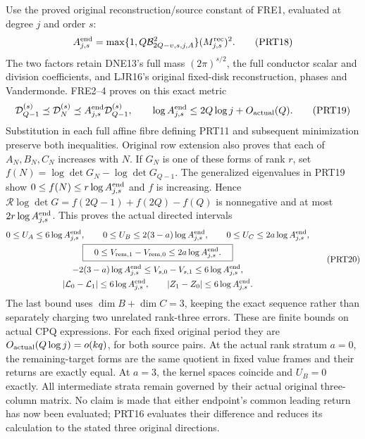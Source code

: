 \documentclass[11pt,a4paper]{article}
\begin{document}
Use the proved original reconstruction/source constant of FRE1,
evaluated at degree $j$ and order $s$:
\[
 A_{j,s}^{\rm end}=
 \max\{1,Q\mathcal B_{2Q-v,s,j,A}^{2}\}
                    (M_{j,s}^{\rm rec})^2.
 \tag{PRT18}
\]
The two factors retain DNE13's full mass $(2\pi)^{s/2}$,
the full conductor scalar and division coefficients, and LJR16's
original fixed-disk reconstruction, phases and Vandermonde.
FRE2--4 proves on this exact metric
\[
 \mathcal D_{Q-1}^{(s)}\preceq\mathcal D_N^{(s)}
   \preceq A_{j,s}^{\rm end}\mathcal D_{Q-1}^{(s)},
 \qquad
 \log A_{j,s}^{\rm end}\le2Q\log j+O_{\rm actual}(Q).
 \tag{PRT19}
\]
Substitution in each full affine fibre defining PRT11 and subsequent
minimization preserve both inequalities. Original row extension also
proves that each of $A_N,B_N,C_N$ increases with $N$.
If $G_N$ is one of these forms of rank $r$, set
$f(N)=\log\det G_N-\log\det G_{Q-1}$.
The generalized eigenvalues in PRT19 show $0\le f(N)\le
r\log A_{j,s}^{\rm end}$ and $f$ is increasing. Hence
$\mathcal R\log\det G=f(2Q-1)+f(2Q)-f(Q)$ is nonnegative
and at most $2r\log A_{j,s}^{\rm end}$.
This proves the actual directed intervals
\[
 \begin{gathered}
 0\le U_A\le6\log A_{j,s}^{\rm end},\qquad
 0\le U_B\le2(3-a)\log A_{j,s}^{\rm end},\qquad
 0\le U_C\le2a\log A_{j,s}^{\rm end},\\
 \boxed{\quad0\le V_{{\rm rem},1}-V_{{\rm rem},0}
                   \le2a\log A_{j,s}^{\rm end}.\quad}\\
 -2(3-a)\log A_{j,s}^{\rm end}
 \le V_{s,0}-V_{s,1}\le6\log A_{j,s}^{\rm end},\\
 |\mathcal L_0-\mathcal L_1|\le6\log A_{j,s}^{\rm end},
 \qquad |Z_1-Z_0|\le6\log A_{j,s}^{\rm end}.
 \end{gathered}\tag{PRT20}
\]
The last bound uses $\dim B+\dim C=3$, keeping the exact
sequence rather than separately charging two unrelated rank-three
errors. These are finite bounds on actual CPQ expressions.
For each fixed original period they are
$O_{\rm actual}(Q\log j)=o(kq)$, for both source pairs.
At the actual rank stratum $a=0$, the remaining-target forms are
the same quotient in fixed value frames and their returns are exactly
equal. At $a=3$, the kernel spaces coincide and $U_B=0$ exactly.
All intermediate strata remain governed by their actual original
three-column matrix. No claim is made that either endpoint's common
leading return has now been evaluated; PRT16 evaluates their difference
and reduces its calculation to the stated three original directions.
\end{document}
